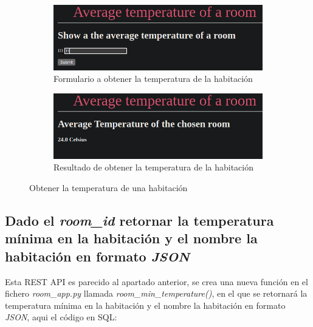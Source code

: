 \documentclass[11pt]{report}
\begin{document}
\begin{figure}[H]
  \begin{subfigure}{0.5\textwidth}
    \centering
    \includegraphics[scale=0.34]{img/avg_temperatura_room.png}
    \caption{Formulario a obtener la temperatura de la habitación}
  \end{subfigure}%
  \begin{subfigure}{0.5\textwidth}
    \centering
    \includegraphics[scale=0.34]{img/result_avg_temperatura_room.png}
    \caption{Resultado de obtener la temperatura de la habitación}
  \end{subfigure}
  \caption{Obtener la temperatura de una habitación}
\end{figure}

\cleardoublepage

\subsection{Dado el \emph{room\_id} retornar la temperatura mínima en la habitación y el nombre la habitación en formato \emph{JSON}}
Esta REST API es parecido al apartado anterior, se crea una nueva función en el fichero \emph{room\_app.py} llamada
\emph{room\_min\_temperature()}, en el que se retornará la temperatura mínima en la habitación y el nombre la habitación
en formato \emph{JSON}, aqui el código en SQL:
\lstset{style=mystyle}

\end{document}
